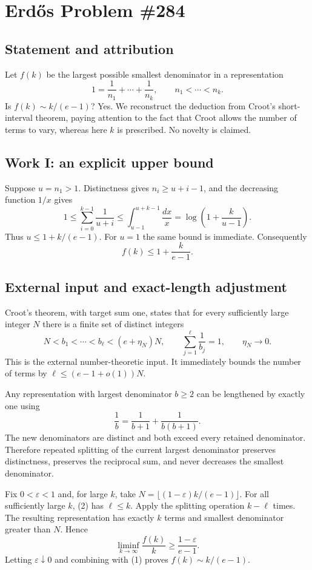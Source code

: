 \section{Erd\H{o}s Problem \#284}
\subsection{Statement and attribution}
Let $f(k)$ be the largest possible smallest denominator in a representation
\[
 1=\frac1{n_1}+\cdots+\frac1{n_k},\qquad n_1<\cdots<n_k.
\]
Is $f(k)\sim k/(e-1)$? Yes. We reconstruct the deduction from Croot's short-interval theorem, paying attention to the fact that Croot allows the number of terms to vary, whereas here $k$ is prescribed. No novelty is claimed.

\subsection{Work I: an explicit upper bound}
Suppose $u=n_1>1$. Distinctness gives $n_i\ge u+i-1$, and the decreasing function $1/x$ gives
\[
 1\le\sum_{i=0}^{k-1}\frac1{u+i}
 \le\int_{u-1}^{u+k-1}\frac{dx}{x}
 =\log\left(1+\frac{k}{u-1}\right).
\]
Thus $u\le1+k/(e-1)$. For $u=1$ the same bound is immediate. Consequently
\[
 f(k)\le1+\frac{k}{e-1}.
 \tag{1}
\]

\subsection{External input and exact-length adjustment}
Croot's theorem, with target sum one, states that for every sufficiently large integer $N$ there is a finite set of distinct integers
\[
 N<b_1<\cdots<b_\ell<(e+\eta_N)N,
 \qquad \sum_{j=1}^{\ell}\frac1{b_j}=1,
 \qquad \eta_N\to0.
 \tag{2}
\]
This is the external number-theoretic input. It immediately bounds the number of terms by
$\ell\le(e-1+o(1))N$.

Any representation with largest denominator $b\ge2$ can be lengthened by exactly one using
\[
 \frac1b=\frac1{b+1}+\frac1{b(b+1)}.
\]
The new denominators are distinct and both exceed every retained denominator. Therefore repeated splitting of the current largest denominator preserves distinctness, preserves the reciprocal sum, and never decreases the smallest denominator.

Fix $0<\varepsilon<1$ and, for large $k$, take
$N=\lfloor(1-\varepsilon)k/(e-1)\rfloor$. For all sufficiently large $k$, (2) has $\ell\le k$. Apply the splitting operation $k-\ell$ times. The resulting representation has exactly $k$ terms and smallest denominator greater than $N$. Hence
\[
 \liminf_{k\to\infty}\frac{f(k)}k\ge\frac{1-\varepsilon}{e-1}.
\]
Letting $\varepsilon\downarrow0$ and combining with (1) proves $f(k)\sim k/(e-1)$.

